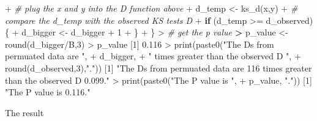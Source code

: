 \documentclass[
]{article}
\newenvironment{Shaded}{\begin{snugshade}}{\end{snugshade}}
\newcommand{\CommentTok}[1]{\textcolor[rgb]{0.56,0.35,0.01}{\textit{#1}}}
\newcommand{\ControlFlowTok}[1]{\textcolor[rgb]{0.13,0.29,0.53}{\textbf{#1}}}
\newcommand{\DecValTok}[1]{\textcolor[rgb]{0.00,0.00,0.81}{#1}}
\newcommand{\ErrorTok}[1]{\textcolor[rgb]{0.64,0.00,0.00}{\textbf{#1}}}
\newcommand{\FloatTok}[1]{\textcolor[rgb]{0.00,0.00,0.81}{#1}}
\newcommand{\FunctionTok}[1]{\textcolor[rgb]{0.00,0.00,0.00}{#1}}
\newcommand{\NormalTok}[1]{#1}
\newcommand{\OtherTok}[1]{\textcolor[rgb]{0.56,0.35,0.01}{#1}}
\newcommand{\SpecialCharTok}[1]{\textcolor[rgb]{0.00,0.00,0.00}{#1}}
\newcommand{\StringTok}[1]{\textcolor[rgb]{0.31,0.60,0.02}{#1}}
\begin{document}
\begin{Shaded}
\begin{Highlighting}[]
\SpecialCharTok{+}   \CommentTok{\# plug the x and y into the D function above}
\SpecialCharTok{+}\NormalTok{   d\_temp }\OtherTok{\textless{}{-}} \FunctionTok{ks\_d}\NormalTok{(x,y)}
\SpecialCharTok{+}   \CommentTok{\# compare the d\_temp with the observed KS test\textquotesingle{}s D}
\SpecialCharTok{+}   \ControlFlowTok{if}\NormalTok{ (d\_temp }\SpecialCharTok{\textgreater{}=}\NormalTok{ d\_observed)\{}
\SpecialCharTok{+}\NormalTok{     d\_bigger }\OtherTok{\textless{}{-}}\NormalTok{ d\_bigger }\SpecialCharTok{+} \DecValTok{1}
\SpecialCharTok{+}\NormalTok{   \}}
\SpecialCharTok{+}\NormalTok{ \}}
\SpecialCharTok{\textgreater{}} \CommentTok{\# get the p value}
\ErrorTok{\textgreater{}}\NormalTok{ p\_value }\OtherTok{\textless{}{-}} \FunctionTok{round}\NormalTok{(d\_bigger}\SpecialCharTok{/}\NormalTok{B,}\DecValTok{3}\NormalTok{)}
\SpecialCharTok{\textgreater{}}\NormalTok{ p\_value}
\NormalTok{[}\DecValTok{1}\NormalTok{] }\FloatTok{0.116}
\SpecialCharTok{\textgreater{}} \FunctionTok{print}\NormalTok{(}\FunctionTok{paste0}\NormalTok{(}\StringTok{"The Ds from permuated data are "}\NormalTok{, }
\SpecialCharTok{+}\NormalTok{              d\_bigger, }
\SpecialCharTok{+}              \StringTok{" times greater than the observed D "}\NormalTok{,}
\SpecialCharTok{+}              \FunctionTok{round}\NormalTok{(d\_observed,}\DecValTok{3}\NormalTok{),}\StringTok{"."}\NormalTok{))}
\NormalTok{[}\DecValTok{1}\NormalTok{] }\StringTok{"The Ds from permuated data are 116 times greater than the observed D 0.099."}
\SpecialCharTok{\textgreater{}} \FunctionTok{print}\NormalTok{(}\FunctionTok{paste0}\NormalTok{(}\StringTok{"The P value is "}\NormalTok{, }
\SpecialCharTok{+}\NormalTok{              p\_value, }\StringTok{"."}\NormalTok{))}
\NormalTok{[}\DecValTok{1}\NormalTok{] }\StringTok{"The P value is 0.116."}
\end{Highlighting}
\end{Shaded}

The result
\end{document}
